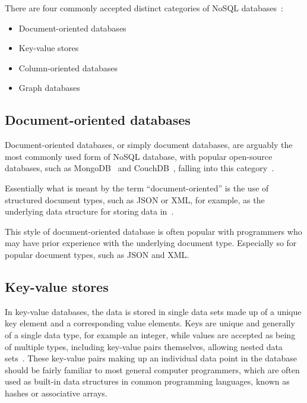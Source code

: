 \documentclass{article}
\begin{document}
There are four commonly accepted distinct categories of NoSQL databases~\cite{tauro2012comparative}:

\begin{itemize}
    \item Document-oriented databases
    \item Key-value stores
    \item Column-oriented databases
    \item Graph databases
\end{itemize}

\subsection{Document-oriented databases} %
\label{ssub:document_oriented}

Document-oriented databases, or simply document databases, are arguably the most commonly used form of NoSQL
database, with popular open-source databases, such as MongoDB~\cite{6_mongodb.org_2015} and
CouchDB~\cite{5_couchdb.apache.org_2015}, falling into this category~\cite{tauro2012comparative}.

Essentially what is meant by the term ``document-oriented'' is the use of structured document types, such
as JSON or XML, for example, as the underlying data structure for storing data in~\cite{han2011survey}.

This style of document-oriented database is often popular with programmers who may have prior experience
with the underlying document type. Especially so for popular document types, such as JSON and XML.



\subsection{Key-value stores}
\label{ssub:kvs}

In key-value databases, the data is stored in single data sets made up of a unique key element and a corresponding
value elements. Keys are unique and generally of a single data type, for example an integer, while values
are accepted as being of multiple types, including key-value pairs themselves, allowing nested data
sets~\cite{weber2010nosql}. These key-value pairs making up an individual data point in the database
should be fairly familiar to most general computer programmers, which are often used as built-in
data structures in common programming languages, known as hashes or associative arrays.
\end{document}
